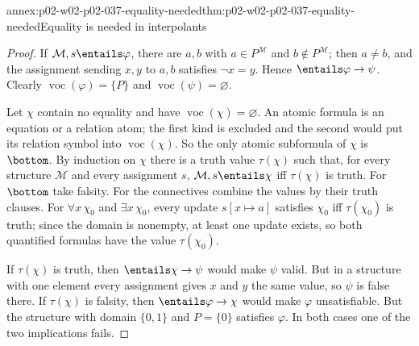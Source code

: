\begin{annexitem}{annex:p02-w02-p02-037-equality-needed}{thm:p02-w02-p02-037-equality-needed}{Equality is needed in interpolants}
\begin{proof}
If \(\mathcal M,s\entails\varphi\), there are \(a,b\) with
\(a\in P^{\mathcal M}\) and \(b\notin P^{\mathcal M}\); then \(a\neq b\), and
the assignment sending \(x,y\) to \(a,b\) satisfies \(\neg x=y\).  Hence
\(\entails\varphi\to\psi\).  Clearly \(\operatorname{voc}(\varphi)=\{P\}\)
and \(\operatorname{voc}(\psi)=\varnothing\).

Let \(\chi\) contain no equality and have
\(\operatorname{voc}(\chi)=\varnothing\).  An atomic formula is an equation
or a relation atom; the first kind is excluded and the second would put its
relation symbol into \(\operatorname{voc}(\chi)\).  So the only atomic
subformula of \(\chi\) is \(\bottom\).  By induction on \(\chi\) there is a
truth value \(\tau(\chi)\) such that, for every structure \(\mathcal M\) and
every assignment \(s\), \(\mathcal M,s\entails\chi\) iff \(\tau(\chi)\) is
truth.  For \(\bottom\) take falsity.  For the connectives combine the
values by their truth clauses.  For \(\forall x\,\chi_0\) and
\(\exists x\,\chi_0\), every update \(s[x\mapsto a]\) satisfies \(\chi_0\)
iff \(\tau(\chi_0)\) is truth; since the domain is nonempty, at least one
update exists, so both quantified formulas have the value
\(\tau(\chi_0)\).

If \(\tau(\chi)\) is truth, then \(\entails\chi\to\psi\) would make
\(\psi\) valid.  But in a structure with one element every assignment gives
\(x\) and \(y\) the same value, so \(\psi\) is false there.  If
\(\tau(\chi)\) is falsity, then \(\entails\varphi\to\chi\) would make
\(\varphi\) unsatisfiable.  But the structure with domain \(\{0,1\}\) and
\(P=\{0\}\) satisfies \(\varphi\).  In both cases one of the two
implications fails.
\end{proof}
\end{annexitem}

